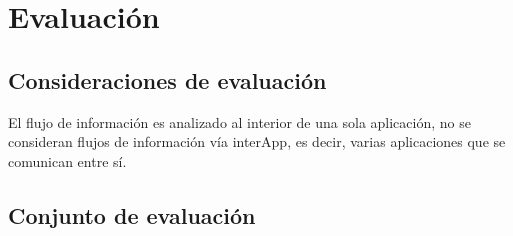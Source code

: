 \label{ch:evaluacion}
\chapter{Evaluación}

\section{Consideraciones de evaluación}
El flujo de información es analizado al interior de una sola aplicación, no se
consideran flujos de información vía interApp, es decir, varias aplicaciones que
se comunican entre sí.

\section{Conjunto de evaluación}
\label{sec:evalSet}

